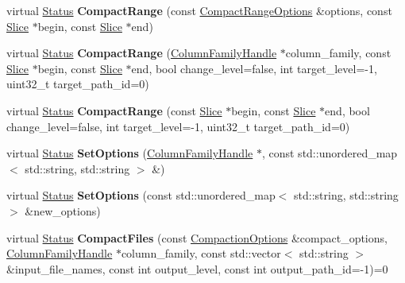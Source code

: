 \begin{DoxyCompactItemize}
\item 
virtual \hyperlink{classrocksdb_1_1Status}{Status} {\bfseries Compact\+Range} (const \hyperlink{structrocksdb_1_1CompactRangeOptions}{Compact\+Range\+Options} \&options, const \hyperlink{classrocksdb_1_1Slice}{Slice} $\ast$begin, const \hyperlink{classrocksdb_1_1Slice}{Slice} $\ast$end)\hypertarget{classrocksdb_1_1DB_a405ebb44a9ca8dff9fff6def599c1a94}{}\label{classrocksdb_1_1DB_a405ebb44a9ca8dff9fff6def599c1a94}

\item 
virtual \hyperlink{classrocksdb_1_1Status}{Status} {\bfseries Compact\+Range} (\hyperlink{classrocksdb_1_1ColumnFamilyHandle}{Column\+Family\+Handle} $\ast$column\+\_\+family, const \hyperlink{classrocksdb_1_1Slice}{Slice} $\ast$begin, const \hyperlink{classrocksdb_1_1Slice}{Slice} $\ast$end, bool change\+\_\+level=false, int target\+\_\+level=-\/1, uint32\+\_\+t target\+\_\+path\+\_\+id=0)\hypertarget{classrocksdb_1_1DB_a7dd130ae3133ee9390fc27436cb4ca30}{}\label{classrocksdb_1_1DB_a7dd130ae3133ee9390fc27436cb4ca30}

\item 
virtual \hyperlink{classrocksdb_1_1Status}{Status} {\bfseries Compact\+Range} (const \hyperlink{classrocksdb_1_1Slice}{Slice} $\ast$begin, const \hyperlink{classrocksdb_1_1Slice}{Slice} $\ast$end, bool change\+\_\+level=false, int target\+\_\+level=-\/1, uint32\+\_\+t target\+\_\+path\+\_\+id=0)\hypertarget{classrocksdb_1_1DB_abde04eaf7df420cd1e8b9e3a185ac7fd}{}\label{classrocksdb_1_1DB_abde04eaf7df420cd1e8b9e3a185ac7fd}

\item 
virtual \hyperlink{classrocksdb_1_1Status}{Status} {\bfseries Set\+Options} (\hyperlink{classrocksdb_1_1ColumnFamilyHandle}{Column\+Family\+Handle} $\ast$, const std\+::unordered\+\_\+map$<$ std\+::string, std\+::string $>$ \&)\hypertarget{classrocksdb_1_1DB_a28795d0bb3016cff44b19f224d7114f8}{}\label{classrocksdb_1_1DB_a28795d0bb3016cff44b19f224d7114f8}

\item 
virtual \hyperlink{classrocksdb_1_1Status}{Status} {\bfseries Set\+Options} (const std\+::unordered\+\_\+map$<$ std\+::string, std\+::string $>$ \&new\+\_\+options)\hypertarget{classrocksdb_1_1DB_aa2c805ad4ad7a1e37390d95f67502740}{}\label{classrocksdb_1_1DB_aa2c805ad4ad7a1e37390d95f67502740}

\item 
virtual \hyperlink{classrocksdb_1_1Status}{Status} {\bfseries Compact\+Files} (const \hyperlink{structrocksdb_1_1CompactionOptions}{Compaction\+Options} \&compact\+\_\+options, \hyperlink{classrocksdb_1_1ColumnFamilyHandle}{Column\+Family\+Handle} $\ast$column\+\_\+family, const std\+::vector$<$ std\+::string $>$ \&input\+\_\+file\+\_\+names, const int output\+\_\+level, const int output\+\_\+path\+\_\+id=-\/1)=0\hypertarget{classrocksdb_1_1DB_a6d291df380bb41a6737689c3d33e7d73}{}\label{classrocksdb_1_1DB_a6d291df380bb41a6737689c3d33e7d73}


\end{DoxyCompactItemize}
